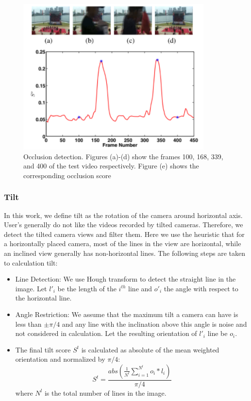 \documentclass{sig-alternate}
\begin{document}
\begin{figure}
    \centering
    \includegraphics{img3.png}
    \caption{Occlusion detection. Figures (a)-(d) show the frames
100, 168, 339, and 400 of the test video respectively. Figure (e)
shows the corresponding occlusion score}
    \label{fig:fig3}
\end{figure}

\subsubsection{Tilt}
In this work, we define tilt as the rotation of the camera around horizontal axis. User's generally do not like the videos recorded by tilted cameras. Therefore, we detect the tilted camera views and filter them. Here we use the heuristic that for a horizontally placed camera, most of the lines in the view are horizontal, while an inclined view generally has non-horizontal lines. The following steps are taken to calculation tilt:
\begin{itemize}
    \item Line Detection: We use Hough transform to detect the straight line in the image. Let $l'_i$ be the length of the $i^{th}$ line and $o'_i$ the angle with respect to the horizontal line.
    \item Angle Restriction: We assume that the maximum tilt a camera can have is less than $\pm\pi/4$ and any line with the inclination above this angle is noise and not considered in calculation. Let the resulting orientation of $l'_i$ line be $o_i$.
    \item The final tilt score $S^t$ is calculated as absolute of the mean weighted orientation and normalized by $\pi/4$:
    \begin{equation}
        S^t=\frac{abs(\frac{1}{N^l}\sum_{i=1}^{N^l} o_i * l_i)}{\pi/4}
    \end{equation}
    where $N^l$ is the total number of lines in the image.
\end{itemize}
\end{document}
